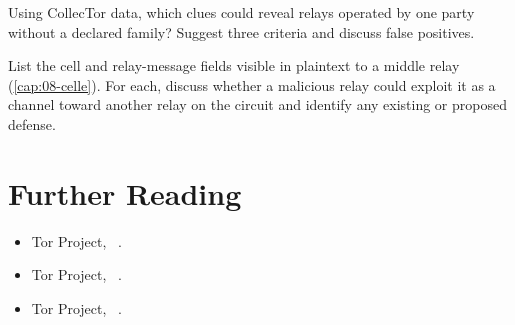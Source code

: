 \begin{esercizio}[2]\label{es:27-segnali}
Using CollecTor data, which clues could reveal relays operated by one party without a declared family? Suggest three criteria and discuss false positives.
\end{esercizio}

\begin{esercizio}[3]\label{es:27-canali}
List the cell and relay-message fields visible in plaintext to a middle relay (\cref{cap:08-celle}). For each, discuss whether a malicious relay could exploit it as a channel toward another relay on the circuit and identify any existing or proposed defense.
\end{esercizio}

\section*{Further Reading}
\begin{itemize}
  \item Tor Project, ~\cite{torblog2014relayearly}.
  \item Tor Project, ~\cite{torblog2022badrelays}.
  \item Tor Project, ~\cite{torblog2023pow}.
\end{itemize}
